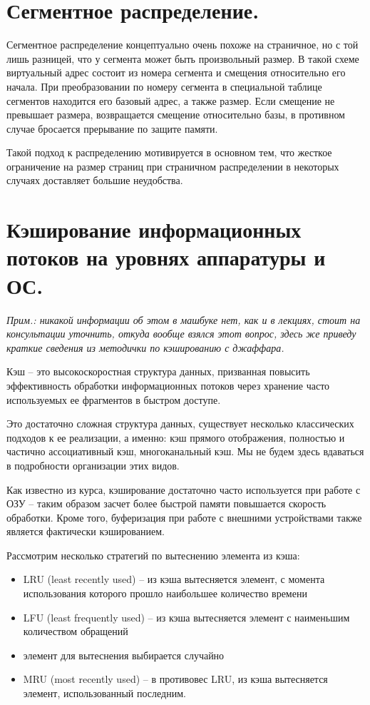 \documentclass[a4paper,12pt,titlepage,finall]{article}
\begin{document}
\section{Сегментное распределение.}
Сегментное распределение концептуально очень похоже на страничное, но с той лишь разницей, что у сегмента может быть произвольный размер. В такой схеме виртуальный адрес состоит из номера сегмента и смещения относительно его начала. При преобразовании по номеру сегмента в специальной таблице сегментов находится его базовый адрес, а также размер. Если смещение не превышает размера, возвращается смещение относительно базы, в противном случае бросается прерывание по защите памяти.

Такой подход к распределению мотивируется в основном тем, что жесткое ограничение на размер страниц при страничном распределении в некоторых случаях доставляет большие неудобства.

\section{Кэширование информационных потоков на уровнях аппаратуры и ОС.}
\textit{Прим.: никакой информации об этом в машбуке нет, как и в лекциях, стоит на консультации уточнить, откуда вообще взялся этот вопрос, здесь же приведу краткие сведения из методички по кэшированию с джаффара.}

Кэш -- это высокоскоростная структура данных, призванная повысить эффективность обработки информационных потоков через хранение часто используемых ее фрагментов в быстром доступе.

Это достаточно сложная структура данных, существует несколько классических подходов к ее реализации, а именно: кэш прямого отображения, полностью и частично ассоциативный кэш, многоканальный кэш. Мы не будем здесь вдаваться в подробности организации этих видов.

Как известно из курса, кэширование достаточно часто используется при работе с ОЗУ -- таким образом засчет более быстрой памяти повышается скорость обработки. Кроме того, буферизация при работе с внешними устройствами также является фактически кэшированием.

Рассмотрим несколько стратегий по вытеснению элемента из кэша:
\begin{itemize}
    \item LRU (least recently used) -- из кэша вытесняется элемент, с момента использования которого прошло наибольшее количество времени
    \item LFU (least frequently used) -- из кэша вытесняется элемент с наименьшим количеством обращений
    \item элемент для вытеснения выбирается случайно
    \item MRU (most recently used) -- в противовес LRU, из кэша вытесняется элемент, использованный последним.
\end{itemize}
\end{document}
